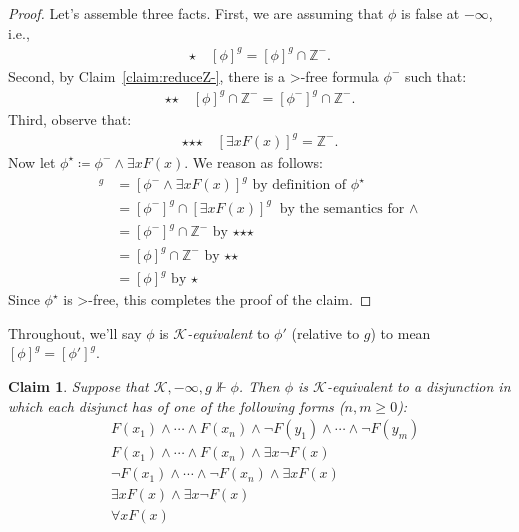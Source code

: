 \documentclass[12pt]{article}
\newtheorem{claim}{Claim}
\newcommand{\mystar}{\mathord{\star}}
\newcommand{\would}{\mathbin{>}}
\newcommand{\then}{\mathbin{\supset}}
\begin{document}
\begin{proof}
    Let's assemble three facts. 
    First, we are assuming that $\phi$ is false at $-\infty$, i.e., 
    \begin{align*}
        \mystar \quad [\phi]^g=[\phi]^g\cap\mathbb{Z}^-.
    \end{align*}
    Second, %
    by Claim~\ref{claim:reduceZ-}, there is a $\would$-free formula $\phi^-$ such that:
    \begin{align*}
        \mystar\mystar \quad [\phi]^g \cap \mathbb{Z}^- = [\phi^-]^g \cap \mathbb{Z}^-.
    \end{align*}
    Third, observe that:
    \begin{align*}
        \mystar\mystar\mystar \quad [\exists x F(x)]^g = \mathbb{Z}^-.
    \end{align*}
    Now let $\phi^\star \coloneqq \phi^- \wedge \exists x F(x)$. We reason as follows:
    \begin{align*}
        [\phi^\star]^g & = [\phi^- \wedge \exists x F(x)]^g \text{ by definition of $\phi^\star$}\\
        & =  [\phi^-]^g \cap [\exists x F(x)]^g \text{ by the semantics for $\wedge$}\\
        & =  [\phi^-]^g \cap \mathbb{Z}^- \text{ by $\mystar\mystar\mystar$}\\
        & =  [\phi]^g \cap \mathbb{Z}^- \text{ by $\mystar\mystar$}\\
        & =  [\phi]^g \text{ by $\mystar$}
    \end{align*}
    Since $\phi^\star$ is $\would$-free, this completes the proof of the claim.
\end{proof}

Throughout, we'll say $\phi$ is \emph{$\mathcal{K}$-equivalent} to $\phi'$ (relative to $g$) to mean $[\phi]^g = [\phi']^g$. 

\begin{claim}\label{into-dnf}
    Suppose that $\mathcal{K},-\infty,g \nVdash \phi$. Then $\phi$ is $\mathcal{K}$-equivalent to a disjunction in which each disjunct has of one of the following forms ($n,m \geq 0$):
    \begin{align*}
        & F(x_1) \wedge \cdots \wedge F(x_n) \wedge \neg F(y_1) \wedge \cdots \wedge \neg F(y_m) \\
        & F(x_1) \wedge \cdots \wedge F(x_n) \wedge \exists x \neg F(x) \\
        & \neg F(x_1) \wedge \cdots \wedge \neg F(x_n) \wedge \exists x F(x) \\
        & \exists x F(x) \wedge \exists x \neg F(x) \\
        & \forall x F(x)
    \end{align*}
\end{claim}
\end{document}
